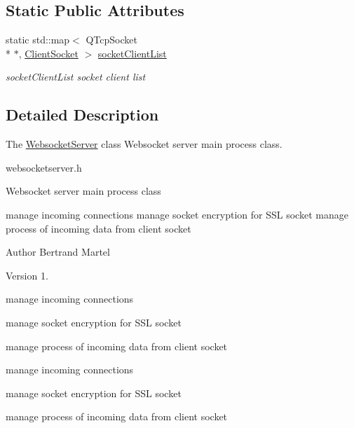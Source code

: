 \subsection*{Static Public Attributes}
\begin{DoxyCompactItemize}
\item 
static std\-::map$<$ Q\-Tcp\-Socket \\*
$\ast$, \hyperlink{class_client_socket}{Client\-Socket} $>$ \hyperlink{class_websocket_server_acfa614b7fed5046d8cf7ca65baabb275}{socket\-Client\-List}
\begin{DoxyCompactList}\small\item\em socket\-Client\-List socket client list \end{DoxyCompactList}\end{DoxyCompactItemize}


\subsection{Detailed Description}
The \hyperlink{class_websocket_server}{Websocket\-Server} class Websocket server main process class. 

websocketserver.\-h

Websocket server main process class

manage incoming connections manage socket encryption for S\-S\-L socket manage process of incoming data from client socket

\begin{DoxyAuthor}{Author}
Bertrand Martel 
\end{DoxyAuthor}
\begin{DoxyVersion}{Version}
1. 
\begin{DoxyItemize}
\item manage incoming connections 
\item manage socket encryption for S\-S\-L socket 
\item manage process of incoming data from client socket 
\end{DoxyItemize}
\end{DoxyVersion}

\begin{DoxyItemize}
\item manage incoming connections 
\item manage socket encryption for S\-S\-L socket 
\item manage process of incoming data from client socket 
\end{DoxyItemize}

